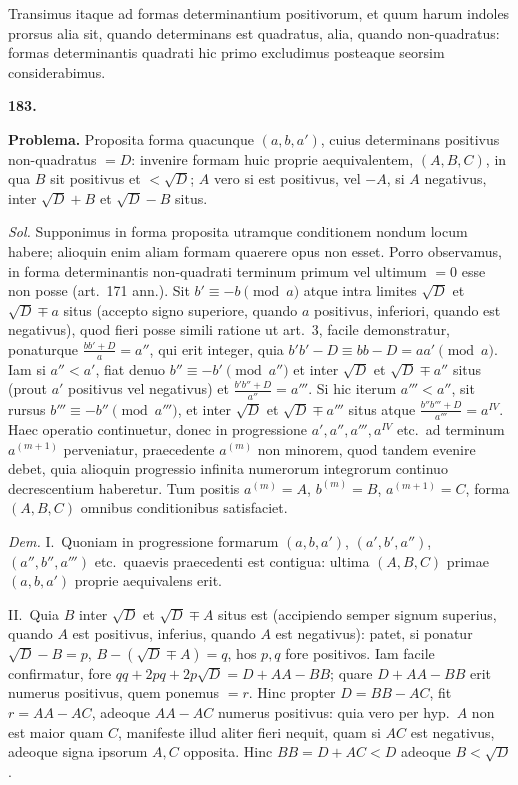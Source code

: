 \documentclass[12pt,a4paper]{article}
\theoremstyle{plain}
\theoremstyle{definition}
\theoremstyle{remark}
\begin{document}
Transimus itaque ad formas determinantium positivorum, et quum harum indoles prorsus alia sit, quando determinans est quadratus, alia, quando non-quadratus: formas determinantis quadrati hic primo excludimus posteaque seorsim considerabimus.

\textbf{183.}

\textbf{Problema.} Proposita forma quacunque $(a,b,a')$, cuius determinans positivus non-quadratus $=D$: invenire formam huic proprie aequivalentem, $(A,B,C)$, in qua $B$ sit positivus et $<\sqrt{D}$; $A$ vero si est positivus, vel $-A$, si $A$ negativus, inter $\sqrt{D}+B$ et $\sqrt{D}-B$ situs.

\textit{Sol.} Supponimus in forma proposita utramque conditionem nondum locum habere; alioquin enim aliam formam quaerere opus non esset. Porro observamus, in forma determinantis non-quadrati terminum primum vel ultimum $=0$ esse non posse (art.\ 171 ann.). Sit $b'\equiv -b\pmod{a}$ atque intra limites $\sqrt{D}$ et $\sqrt{D}\mp a$ situs (accepto signo superiore, quando $a$ positivus, inferiori, quando est negativus), quod fieri posse simili ratione ut art.\ 3, facile demonstratur, ponaturque $\frac{bb'+D}{a}=a''$, qui erit integer, quia $b'b'-D\equiv bb-D=aa'\pmod{a}$. Iam si $a''<a'$, fiat denuo $b''\equiv -b'\pmod{a''}$ et inter $\sqrt{D}$ et $\sqrt{D}\mp a''$ situs (prout $a'$ positivus vel negativus) et $\frac{b'b''+D}{a''}=a'''$. Si hic iterum $a'''<a''$, sit rursus $b'''\equiv -b''\pmod{a'''}$, et inter $\sqrt{D}$ et $\sqrt{D}\mp a'''$ situs atque $\frac{b''b'''+D}{a'''}=a^{IV}$. Haec operatio continuetur, donec in progressione $a',a'',a''',a^{IV}$ etc.\ ad terminum $a^{(m+1)}$ perveniatur, praecedente $a^{(m)}$ non minorem, quod tandem evenire debet, quia alioquin progressio infinita numerorum integrorum continuo decrescentium haberetur. Tum positis $a^{(m)}=A$, $b^{(m)}=B$, $a^{(m+1)}=C$, forma $(A,B,C)$ omnibus conditionibus satisfaciet.

\textit{Dem.} I.\ Quoniam in progressione formarum $(a,b,a')$, $(a',b',a'')$, $(a'',b'',a''')$ etc.\ quaevis praecedenti est contigua: ultima $(A,B,C)$ primae $(a,b,a')$ proprie aequivalens erit.

II.\ Quia $B$ inter $\sqrt{D}$ et $\sqrt{D}\mp A$ situs est (accipiendo semper signum superius, quando $A$ est positivus, inferius, quando $A$ est negativus): patet, si ponatur $\sqrt{D}-B=p$, $B-(\sqrt{D}\mp A)=q$, hos $p,q$ fore positivos. Iam facile confirmatur, fore $qq+2pq+2p\sqrt{D}=D+AA-BB$; quare $D+AA-BB$ erit numerus positivus, quem ponemus $=r$. Hinc propter $D=BB-AC$, fit $r=AA-AC$, adeoque $AA-AC$ numerus positivus: quia vero per hyp.\ $A$ non est maior quam $C$, manifeste illud aliter fieri nequit, quam si $AC$ est negativus, adeoque signa ipsorum $A,C$ opposita. Hinc $BB=D+AC<D$ adeoque $B<\sqrt{D}$.
\end{document}
